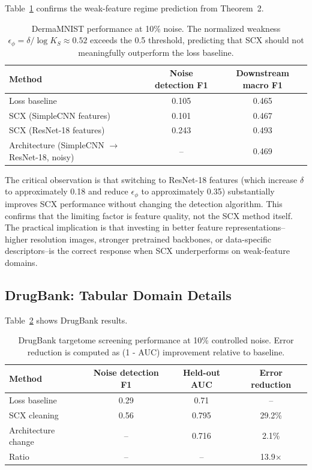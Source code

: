 \documentclass[11pt,a4paper]{article}
\begin{document}
Table~\ref{tab:S1_derma} confirms the weak-feature regime prediction from Theorem~2.

\begin{table}[H]
\centering
\caption{DermaMNIST performance at 10\% noise. The normalized weakness $\epsilon_\phi = \delta / \log K_S \approx 0.52$ exceeds the 0.5 threshold, predicting that SCX should not meaningfully outperform the loss baseline.}
\label{tab:S1_derma}
\begin{tabular}{lcc}
\toprule
Method & Noise detection F1 & Downstream macro F1 \\
\midrule
Loss baseline & 0.105 & 0.465 \\
SCX (SimpleCNN features) & 0.101 & 0.467 \\
SCX (ResNet-18 features) & 0.243 & 0.493 \\
Architecture (SimpleCNN $\to$ ResNet-18, noisy) & -- & 0.469 \\
\bottomrule
\end{tabular}
\end{table}

The critical observation is that switching to ResNet-18 features (which increase $\delta$ to approximately 0.18 and reduce $\epsilon_\phi$ to approximately 0.35) substantially improves SCX performance without changing the detection algorithm. This confirms that the limiting factor is feature quality, not the SCX method itself. The practical implication is that investing in better feature representations--higher resolution images, stronger pretrained backbones, or data-specific descriptors--is the correct response when SCX underperforms on weak-feature domains.

\subsection{DrugBank: Tabular Domain Details}

Table~\ref{tab:S1_drugbank} shows DrugBank results.

\begin{table}[H]
\centering
\caption{DrugBank targetome screening performance at 10\% controlled noise. Error reduction is computed as (1 - AUC) improvement relative to baseline.}
\label{tab:S1_drugbank}
\begin{tabular}{lccc}
\toprule
Method & Noise detection F1 & Held-out AUC & Error reduction \\
\midrule
Loss baseline & 0.29 & 0.71 & -- \\
SCX cleaning & 0.56 & 0.795 & 29.2\% \\
Architecture change & -- & 0.716 & 2.1\% \\
\midrule
Ratio & -- & -- & 13.9$\times$ \\
\bottomrule
\end{tabular}
\end{table}
\end{document}
